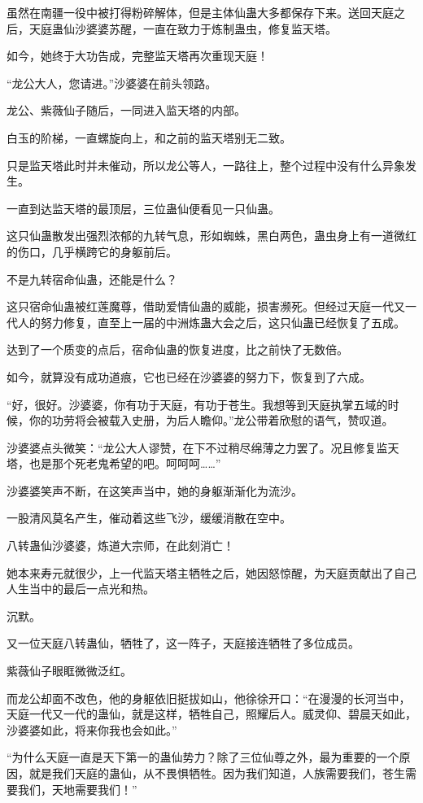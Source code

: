 \begin{this_body}
虽然在南疆一役中被打得粉碎解体，但是主体仙蛊大多都保存下来。送回天庭之后，天庭蛊仙沙婆婆苏醒，一直在致力于炼制蛊虫，修复监天塔。

如今，她终于大功告成，完整监天塔再次重现天庭！

“龙公大人，您请进。”沙婆婆在前头领路。

龙公、紫薇仙子随后，一同进入监天塔的内部。

白玉的阶梯，一直螺旋向上，和之前的监天塔别无二致。

只是监天塔此时并未催动，所以龙公等人，一路往上，整个过程中没有什么异象发生。

一直到达监天塔的最顶层，三位蛊仙便看见一只仙蛊。

这只仙蛊散发出强烈浓郁的九转气息，形如蜘蛛，黑白两色，蛊虫身上有一道微红的伤口，几乎横跨它的身躯前后。

不是九转宿命仙蛊，还能是什么？

这只宿命仙蛊被红莲魔尊，借助爱情仙蛊的威能，损害濒死。但经过天庭一代又一代人的努力修复，直至上一届的中洲炼蛊大会之后，这只仙蛊已经恢复了五成。

达到了一个质变的点后，宿命仙蛊的恢复进度，比之前快了无数倍。

如今，就算没有成功道痕，它也已经在沙婆婆的努力下，恢复到了六成。

“好，很好。沙婆婆，你有功于天庭，有功于苍生。我想等到天庭执掌五域的时候，你的功劳将会被载入史册，为后人瞻仰。”龙公带着欣慰的语气，赞叹道。

沙婆婆点头微笑：“龙公大人谬赞，在下不过稍尽绵薄之力罢了。况且修复监天塔，也是那个死老鬼希望的吧。呵呵呵……”

沙婆婆笑声不断，在这笑声当中，她的身躯渐渐化为流沙。

一股清风莫名产生，催动着这些飞沙，缓缓消散在空中。

八转蛊仙沙婆婆，炼道大宗师，在此刻消亡！

她本来寿元就很少，上一代监天塔主牺牲之后，她因怒惊醒，为天庭贡献出了自己人生当中的最后一点光和热。

沉默。

又一位天庭八转蛊仙，牺牲了，这一阵子，天庭接连牺牲了多位成员。

紫薇仙子眼眶微微泛红。

而龙公却面不改色，他的身躯依旧挺拔如山，他徐徐开口：“在漫漫的长河当中，天庭一代又一代的蛊仙，就是这样，牺牲自己，照耀后人。威灵仰、碧晨天如此，沙婆婆如此，将来你我也会如此。”

“为什么天庭一直是天下第一的蛊仙势力？除了三位仙尊之外，最为重要的一个原因，就是我们天庭的蛊仙，从不畏惧牺牲。因为我们知道，人族需要我们，苍生需要我们，天地需要我们！”


\end{this_body}
